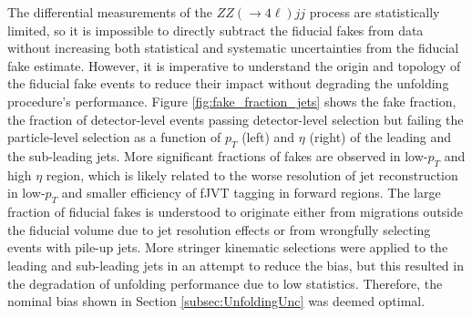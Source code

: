 The differential measurements of the $ZZ(\rightarrow 4\ell)jj$ process are statistically limited, so it is impossible to directly subtract the fiducial fakes from data without increasing both statistical and systematic uncertainties from the fiducial fake estimate. However, it is imperative to understand the origin and topology of the fiducial fake events to reduce their impact without degrading the unfolding procedure's performance. Figure \ref{fig:fake_fraction_jets} shows the fake fraction, the fraction of detector-level events passing detector-level selection but failing the particle-level selection as a function of $p_{T}$ (left) and $\eta$ (right) of the leading and the sub-leading jets. More significant fractions of fakes are observed in low-$p_{T}$ and high $\eta$ region, which is likely related to the worse resolution of jet reconstruction in low-$p_{T}$ and smaller efficiency of fJVT tagging in forward regions. The large fraction of fiducial fakes is understood to originate either from migrations outside the fiducial volume due to jet resolution effects or from wrongfully selecting events with pile-up jets. More stringer kinematic selections were applied to the leading and sub-leading jets in an attempt to reduce the bias, but this resulted in the degradation of unfolding performance due to low statistics. Therefore, the nominal bias shown in Section \ref{subsec:UnfoldingUnc} was deemed optimal. 

